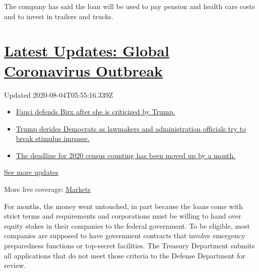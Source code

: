 The company has said the loan will be used to pay pension and health
care costs and to invest in trailers and trucks.

\hypertarget{latest-updates-global-coronavirus-outbreak}{%
\section{\texorpdfstring{\href{https://www.nytimes3xbfgragh.onion/2020/08/03/world/coronavirus-covid-19.html?action=click\&pgtype=Article\&state=default\&region=MAIN_CONTENT_1\&context=storylines_live_updates}{Latest
Updates: Global Coronavirus
Outbreak}}{Latest Updates: Global Coronavirus Outbreak}}\label{latest-updates-global-coronavirus-outbreak}}

Updated 2020-08-04T05:55:16.339Z

\begin{itemize}
\tightlist
\item
  \href{https://www.nytimes3xbfgragh.onion/2020/08/03/world/coronavirus-covid-19.html?action=click\&pgtype=Article\&state=default\&region=MAIN_CONTENT_1\&context=storylines_live_updates\#link-4547638f}{Fauci
  defends Birx after she is criticized by Trump.}
\item
  \href{https://www.nytimes3xbfgragh.onion/2020/08/03/world/coronavirus-covid-19.html?action=click\&pgtype=Article\&state=default\&region=MAIN_CONTENT_1\&context=storylines_live_updates\#link-15e7f995}{Trump
  derides Democrats as lawmakers and administration officials try to
  break stimulus impasse.}
\item
  \href{https://www.nytimes3xbfgragh.onion/2020/08/03/world/coronavirus-covid-19.html?action=click\&pgtype=Article\&state=default\&region=MAIN_CONTENT_1\&context=storylines_live_updates\#link-e5a2cda}{The
  deadline for 2020 census counting has been moved up by a month.}
\end{itemize}

\href{https://www.nytimes3xbfgragh.onion/2020/08/03/world/coronavirus-covid-19.html?action=click\&pgtype=Article\&state=default\&region=MAIN_CONTENT_1\&context=storylines_live_updates}{See
more updates}

More live coverage:
\href{https://www.nytimes3xbfgragh.onion/live/2020/08/03/business/stock-market-today-coronavirus?action=click\&pgtype=Article\&state=default\&region=MAIN_CONTENT_1\&context=storylines_live_updates}{Markets}

For months, the money went untouched, in part because the loans come
with strict terms and requirements and corporations must be willing to
hand over equity stakes in their companies to the federal government. To
be eligible, most companies are supposed to have government contracts
that involve emergency preparedness functions or top-secret facilities.
The Treasury Department submits all applications that do not meet those
criteria to the Defense Department for review.

